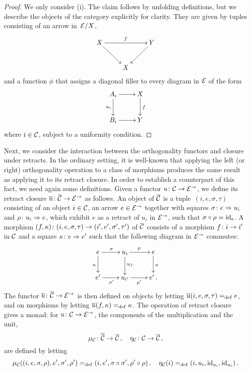 \documentclass[reqno,10pt,a4paper,oneside]{amsart}
\begin{document}
\begin{proof} We only consider (i). The claim follows by unfolding definitions, but we describe the objects of the category explicitly for clarity. They are given by 
tuples consisting of an arrow in~$\cal{E}/X$, 
\[
\xymatrix{
X \ar[dr] \ar[rr]^f  &  & Y \ar[dl] \\
 & X & }
 \]
and a function $\phi$ that assigns a diagonal filler to every diagram in $\cal{E}$ of the form
\[
\xymatrix{
A_i \ar[r] \ar[d]_{u_i} & X \ar[d]^{f} \\
B_i \ar[r] & Y}
\]
where $i \in \cal{C}$, subject to a uniformity condition. 
\end{proof}

\medskip

Next, we consider the interaction between the orthogonality functors and closure under retracts. In the ordinary setting, it is well-known that
applying the left (or right) orthogonality operation to a class of morphisms produces the same result as applying it to its retract closure. 
In order to establish a counterpart of this fact, we need again some definitions. 
Given a  functor $u \co \cal{C} \to \catE^{\to}$, we define its retract closure $\overline{u} \co \overline{\cal{C}} \to \catE^{\to}$ as follows. 
An object of $\overline{\cal{C}}$ is a tuple~$(i, e, \sigma, \tau)$ consisting of an object $i \in \cal{C}$, an arrow $e \in \cal{E}^\to$ together with squares $\sigma \co e \Rightarrow u_i$ and $\rho \co u_i \Rightarrow e$,
which exhibit $e$ as a retract of $u_i$ in  $\catE^{\to}$,  \ie such that $\sigma \cc \rho = \id_e$. 
A morphism $(f, \kappa) \co (i, e, \sigma, \tau) \to (i', e', \sigma', \tau')$ of $\overline{\cal{C}}$  consists of a morphism $f \co i \to i'$ in $\cal{C}$ and a square $\kappa \co e \Rightarrow e'$  such that the following diagram in $\cal{E}^\to$ commutes:
\[
\xymatrix{
  e
  \ar[r]^{\sigma}
    \ar[d]_{\kappa}
&
  u_i
  \ar[r]^{\rho}
  \ar[d]^{u_f}
&
  e
  \ar[d]^{\kappa}
\\
  e'
  \ar[r]_{\sigma'}
&
  u_{i'}
  \ar[r]_{\rho'}
&
  e' \, .
}
\]
The functor $\overline{u} \co \overline{\cal{C}} \to \catE^\to$ is then defined  on objects  by letting 
$\overline{u}(i, e, \sigma, \tau) \defeq e$,
and on morphisms by letting $\overline{u}(f, \kappa) \defeq \kappa$. The operation of retract closure gives a monad: for $u \co \cal{C} \to \catE^{\to}$,
the components of the multiplication and the unit, 
\[
\mu_\cal{C} \co \overline{\overline{\cal{C}}} \to \overline{\cal{C}} \, , \quad
\eta_\cal{C} \co \cal{C} \to \overline{\cal{C}} \, ,
\]
are defined by letting
\[
\mu_\cal{C}((i, e, \sigma,  \rho), e', \sigma', \rho') \defeq (i, e', \sigma \cc \sigma', \rho' \cc \rho) \, , \quad
\eta_\cal{C}(i) \defeq (i, u_i, \id_{u_i}, \id_{u_i}) \, .
\]
\end{document}
